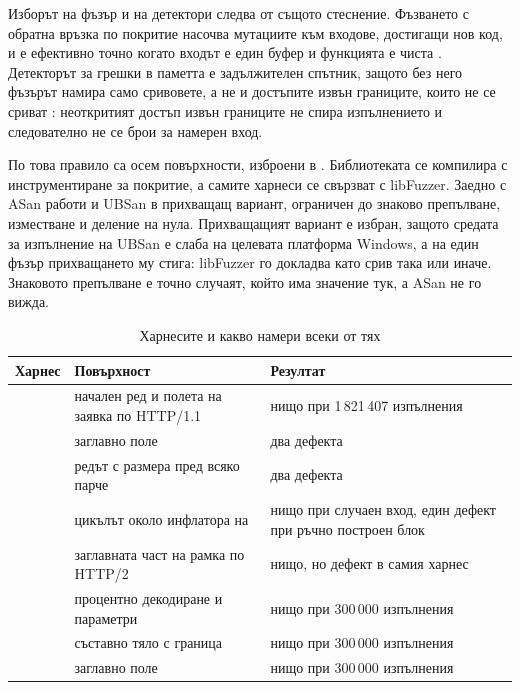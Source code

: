 Изборът на фъзър и на детектори следва от същото стеснение. Фъзването с обратна връзка по
покритие насочва мутациите към входове, достигащи нов код, и е ефективно точно когато входът
е един буфер и функцията е чиста \cite{bohme2016markov}. Детекторът за грешки в паметта е
задължителен спътник, защото без него фъзърът намира само сривовете, а не и достъпите извън
границите, които не се сриват \cite{serebryany2012asan}: неоткритият достъп извън границите
не спира изпълнението и следователно не се брои за намерен вход.

По това правило са осем повърхности, изброени в . Библиотеката се
компилира с инструментиране за покритие, а самите харнеси се свързват с libFuzzer. Заедно с
ASan работи и UBSan в прихващащ вариант, ограничен до знаково препълване, изместване и
деление на нула. Прихващащият вариант е избран, защото средата за изпълнение на UBSan е
слаба на целевата платформа Windows, а на един фъзър прихващането му стига: libFuzzer го
докладва като срив така или иначе. Знаковото препълване е точно случаят, който има значение
тук, а ASan не го вижда.

\begin{table}[H]
\centering
\caption{Харнесите и какво намери всеки от тях}
\label{tab:fuzz-harnesses}
\begin{tabular}{@{}L{2.8cm}L{5.4cm}L{5.4cm}@{}}
\toprule
\textbf{Харнес} & \textbf{Повърхност} & \textbf{Резултат} \\
\midrule
{} & начален ред и полета на заявка по HTTP/1.1 & нищо при 1\,821\,407
изпълнения \\
 & заглавно поле  & два дефекта \\
 & редът с размера пред всяко парче & два дефекта \\
 & цикълът около инфлатора на  & нищо при случаен вход, един
дефект при ръчно построен блок \\
 & заглавната част на рамка по HTTP/2 & нищо, но дефект в самия харнес \\
 & процентно декодиране и параметри & нищо при 300\,000 изпълнения \\
 & съставно тяло с граница & нищо при 300\,000 изпълнения \\
 & заглавно поле  & нищо при 300\,000 изпълнения \\
\bottomrule
\end{tabular}
\end{table}

